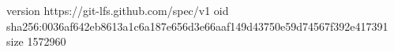 version https://git-lfs.github.com/spec/v1
oid sha256:0036af642eb8613a1c6a187e656d3e66aaf149d43750e59d74567f392e417391
size 1572960
